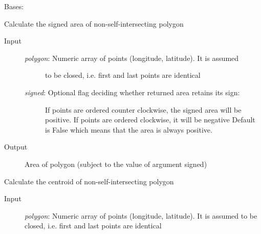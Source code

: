 \documentclass[letterpaper,10pt,english]{sphinxmanual}
\begin{document}
\begin{fulllineitems}
\label{Multi-robot motion planner:planning_sim.PolygonObstacle}
Bases: {\hyperref[Multi-robot motion planner:planning_sim.Obstacle]{}}

\begin{fulllineitems}
\label{Multi-robot motion planner:planning_sim.PolygonObstacle._calculate_polygon_area}
Calculate the signed area of non-self-intersecting polygon
\begin{description}
\item[{Input}] \leavevmode\begin{description}
\item[{\emph{polygon}: Numeric array of points (longitude, latitude). It is assumed}] \leavevmode
to be closed, i.e. first and last points are identical

\item[{\emph{signed}: Optional flag deciding whether returned area retains its sign:}] \leavevmode
If points are ordered counter clockwise, the signed area
will be positive.
If points are ordered clockwise, it will be negative
Default is False which means that the area is always positive.

\end{description}

\item[{Output}] \leavevmode
Area of polygon (subject to the value of argument signed)

\end{description}

\end{fulllineitems}


\begin{fulllineitems}
\label{Multi-robot motion planner:planning_sim.PolygonObstacle._calculate_polygon_centroid}
Calculate the centroid of non-self-intersecting polygon
\begin{description}
\item[{Input}] \leavevmode
\emph{polygon}: Numeric array of points (longitude, latitude). It is assumed
to be closed, i.e. first and last points are identical


\end{description}
\end{fulllineitems}
\end{fulllineitems}
\end{document}
